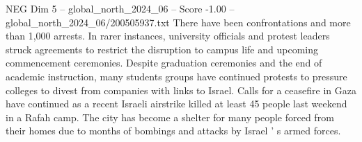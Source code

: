 \begin{textsample}{NEG Dim 5 – global\_north\_2024\_06 – Score -1.00 – global\_north\_2024\_06/200505937.txt}
There have been confrontations and more than 1,000 arrests.
In rarer instances, university officials and protest leaders struck agreements to restrict the disruption to campus life and upcoming commencement ceremonies.
Despite graduation ceremonies and the end of academic instruction, many students groups have continued protests to pressure colleges to divest from companies with links to Israel.
Calls for a ceasefire in Gaza have continued as a recent Israeli airstrike killed at least 45 people last weekend in a Rafah camp.
The city has become a shelter for many people forced from their homes due to months of bombings and attacks by Israel ' s armed forces.

\end{textsample}
